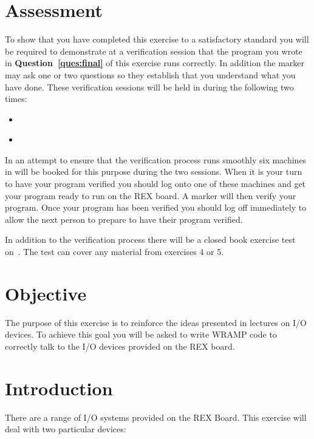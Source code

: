 \documentclass[a4paper,10pt]{article}
\begin{document}



\section{Assessment}

To show that you have completed this exercise to a satisfactory
standard you will be required to demonstrate at a verification session
that the program you wrote in \textbf{Question~\ref{ques:final}} of this exercise
runs correctly. In addition the marker may ask one or two questions so
they establish that you understand what you have done.  These
verification sessions will be held in \ASSESSROOM during the following two
times: 

\begin{itemize}
\item \IODUE~\MORNINGASSESS
\item \IODUE~\AFTERNOONASSESS
\end{itemize}

In an attempt to ensure that the verification process runs smoothly
six machines in \ASSESSROOM will be booked for this purpose during the two
sessions. When it is your turn to have your program verified you
should log onto one of these machines and get your program ready to
run on the REX board. A marker will then verify your program. Once
your program has been verified you should log off immediately to allow
the next person to prepare to have their program verified.

In addition to the verification process there will be a closed book
exercise test on~\textbf{\IOTEST}. The test can cover any material
from exercises 4 or 5.

\section{Objective}

The purpose of this exercise is to reinforce the ideas presented in
lectures on I/O devices. To achieve this goal you will be asked to
write WRAMP code to correctly talk to the I/O devices provided on the
REX board.

\section{Introduction}
There are a range of I/O systems provided on the REX Board. This
exercise will deal with two particular devices:
\end{document}
